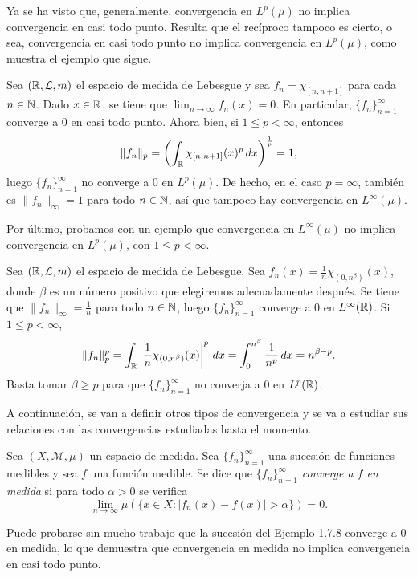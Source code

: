 \documentclass[a4paper, 11pt, oneside]{report}
\begin{document}
Ya se ha visto que, generalmente, convergencia en $L^p(\mu)$ no implica convergencia en casi todo punto. Resulta que el recíproco tampoco es cierto, o sea, convergencia en casi todo punto no implica convergencia en $L^p(\mu)$, como muestra el ejemplo que sigue.

\begin{example}
  Sea $(\mathbb R,\mathcal{L},m)$ el espacio de medida de Lebesgue y sea $f_n = \chi_{[n,n+1]}$ para cada $n \in \mathbb N$. Dado $x \in \mathbb R$, se tiene que $\lim_{n \to \infty} f_n(x)=0$. En particular, $\{f_n\}_{n=1}^\infty$ converge a $0$ en casi todo punto. Ahora bien, si $1 \leq p < \infty$, entonces
  \[\|f_n\|_p = \left(\int_\mathbb R \chi_{[n,n+1]}(x)^p \, dx\right)^{\frac{1}{p}} = 1,\]
  luego $\{f_n\}_{n=1}^\infty$ no converge a $0$ en $L^p(\mu)$. De hecho, en el caso $p = \infty$, también es $\|f_n\|_\infty = 1$ para todo $n \in \mathbb N$, así que tampoco hay convergencia en $L^\infty(\mu)$.
\end{example}

Por último, probamos con un ejemplo que convergencia en $L^\infty(\mu)$ no implica convergencia en $L^p(\mu)$, con $1 \leq p < \infty$.
\begin{example}
  Sea $(\mathbb R,\mathcal{L},m)$ el espacio de medida de Lebesgue. Sea $f_n(x)=\frac{1}{n}\chi_{(0,n^\beta)}(x)$, donde $\beta$ es un número positivo que elegiremos adecuadamente después. Se tiene que $\|f_n\|_{\infty} = \frac{1}{n}$ para todo $n \in \mathbb N$, luego $\{f_n\}_{n=1}^\infty$ converge a $0$ en $L^\infty(\mathbb R)$. Si $1 \leq p < \infty$,
  \[\|f_n\|_p^p = \int_\mathbb R \left|\frac{1}{n}\chi_{(0,n^\beta)}(x)\right|^p \, dx = \int_0^{n^\beta} \frac{1}{n^p} \, dx = n^{\beta - p}.\]
  Basta tomar $\beta \geq p$ para que $\{f_n\}_{n=1}^\infty$ no converja a $0$ en $L^p(\mathbb R)$.
\end{example}

A continuación, se van a definir otros tipos de convergencia y se va a estudiar sus relaciones con las convergencias estudiadas hasta el momento.

\begin{definition}
  Sea $(X,\mathcal{M},\mu)$ un espacio de medida. Sea $\{f_n\}_{n=1}^\infty$ una sucesión de funciones medibles y sea $f$ una función medible. Se dice que $\{f_n\}_{n=1}^\infty$ \emph{converge a $f$ en medida} si para todo $\alpha>0$ se verifica
  \[\lim_{n \to \infty} \mu\left(\{x \in X \colon |f_n(x)-f(x)|>\alpha\}\right) = 0.\]
\end{definition}

Puede probarse sin mucho trabajo que la sucesión del \hyperref[eje:1.8.8]{\color{c1}Ejemplo 1.7.8} converge a $0$ en medida, lo que demuestra que convergencia en medida no implica convergencia en casi todo punto.
\end{document}

